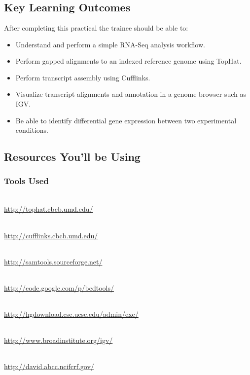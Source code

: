 
\chapter{\moduleTitle}
\newpage

\section{Key Learning Outcomes}

After completing this practical the trainee should be able to:
\begin{itemize}
  \item Understand and perform a simple RNA-Seq analysis workflow.
  \item Perform gapped alignments to an indexed reference genome using TopHat.
  \item Perform transcript assembly using Cufflinks.
  \item Visualize transcript alignments and annotation in a genome browser such as IGV.
  \item Be able to identify differential gene expression between two experimental conditions.
\end{itemize}

\section{Resources You'll be Using}
 
\subsection{Tools Used}
\begin{description}[style=multiline,labelindent=0cm,align=left,leftmargin=1cm]
  \item[Tophat] \hfill\\
    \url{http://tophat.cbcb.umd.edu/}
  \item[Cufflinks] \hfill\\
    \url{http://cufflinks.cbcb.umd.edu/}
  \item[Samtools] \hfill\\
    \url{http://samtools.sourceforge.net/}
  \item[BEDTools] \hfill\\
    \url{http://code.google.com/p/bedtools/}
  \item[UCSC tools] \hfill\\
    \url{http://hgdownload.cse.ucsc.edu/admin/exe/}
  \item[IGV] \hfill\\
    \url{http://www.broadinstitute.org/igv/}
  \item[DAVID Functional Analysis] \hfill\\
    \url{http://david.abcc.ncifcrf.gov/}
\end{description}

